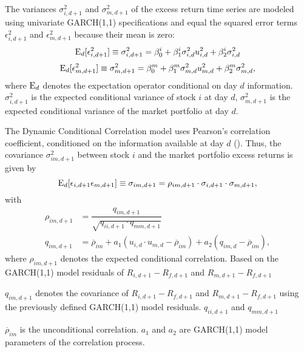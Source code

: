 \documentclass[11pt,a4paper]{article}
\begin{document}
The variances $\sigma_{i,d+1}^2$ and $\sigma_{m,d+1}^2$ of the excess return time series are modeled using univariate GARCH(1,1) specifications and equal the squared error terms $\epsilon_{i,d+1}^2$ and $\epsilon_{m,d+1}^2$ because their mean is zero:
\begin{equation}
    \textrm{E}_d[\epsilon_{i,d+1}^2] \equiv \sigma_{i,d+1}^2 = \beta_0^i + \beta_1^i \sigma_{i,d}^2 u_{i,d}^2 + \beta_2^i \sigma_{i,d}^2
\end{equation}
\begin{equation} \label{eq:DCC_variance_market}
    \textrm{E}_d[\epsilon_{m,d+1}^2] \equiv \sigma_{m,d+1}^2 = \beta_0^m + \beta_1^m \sigma_{m,d}^2 u_{m,d}^2 + \beta_2^m \sigma_{m,d}^2,
\end{equation}
where $\textrm{E}_d$ denotes the expectation operator conditional on day $d$ information. $\sigma_{i,d+1}^2$ is the expected conditional variance of stock $i$ at day $d$, $\sigma_{m,d+1}^2$ is the expected conditional variance of the market portfolio at day $d$.

The Dynamic Conditional Correlation model uses Pearson's correlation coefficient, conditioned on the information available at day $d$ (). Thus, the covariance $\sigma^2_{im,d+1}$ between stock $i$ and the market portfolio excess returns is given by
\begin{equation} \label{eq:DCC_covariance}
    \textrm{E}_d[\epsilon_{i,d+1} \epsilon_{m,d+1}] \equiv \sigma_{im,d+1} =  \rho_{im,d+1} \cdot \sigma_{i,d+1} \cdot \sigma_{m,d+1},
\end{equation}
with
\begin{equation}
\begin{split}
    \rho_{im,d+1} &= \dfrac{q_{im,d+1}}{\sqrt{q_{ii,d+1} \cdot q_{mm,d+1}}} \\
    q_{im,d+1} &= \overline{\rho}_{im} + a_1(u_{i,d} \cdot u_{m,d} - \overline{\rho}_{im}) + a_2(q_{im,d} - \overline{\rho}_{im}),
\end{split}
\end{equation}
where $\rho_{im,d+1}$ denotes the expected conditional correlation. Based on the GARCH(1,1) model residuals of $R_{i,d+1} - R_{f,d+1}$ and $R_{m,d+1} - R_{f,d+1}$
 
 $q_{im,d+1}$ denotes the covariance of $R_{i,d+1} - R_{f,d+1}$ and $R_{m,d+1} - R_{f,d+1}$ using the previously defined GARCH(1,1) model residuals. $q_{ii,d+1}$ and $q_{mm,d+1}$

 $\overline{\rho}_{im}$ is the unconditional correlation. $a_1$ and $a_2$ are GARCH(1,1) model parameters of the correlation process.
\end{document}

